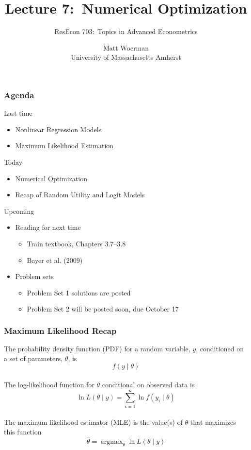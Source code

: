 \documentclass{beamer}
\title[Lecture 7:\ Numerical Optimization]{Lecture 7:\ Numerical Optimization}
\author[ResEcon 703:\ Advanced Econometrics]{ResEcon 703:\ Topics in Advanced Econometrics}
\date{Matt Woerman\\University of Massachusetts Amherst}
\DeclareMathOperator*{\argmax}{argmax}
\begin{document}
{ 
\begin{frame}[noframenumbering]
    \titlepage
\end{frame}
}

\begin{frame}\frametitle{Agenda}
    Last time
    \begin{itemize}
    	\item Nonlinear Regression Models
        \item Maximum Likelihood Estimation
    \end{itemize}
    \vspace{2ex}
    Today
    \begin{itemize}
    	\item Numerical Optimization
    	\item Recap of Random Utility and Logit Models
    \end{itemize}
    \vspace{2ex}
    Upcoming
    \begin{itemize}
        \item Reading for next time
        \begin{itemize}
            \item Train textbook, Chapters 3.7--3.8
            \item Bayer et al. (2009)
        \end{itemize}
        \item Problem sets
        \begin{itemize}
            \item Problem Set 1 solutions are posted
            \item Problem Set 2 will be posted soon, due October 17
        \end{itemize}
    \end{itemize}
\end{frame}

\begin{frame}\frametitle{Maximum Likelihood Recap}
    The probability density function (PDF) for a random variable, $y$, conditioned on a set of parameters, $\theta$, is
    $$f(y \mid \theta)$$ \\
    The log-likelihood function for $\theta$ conditional on observed data is
    $$\ln L(\theta \mid y) = \sum_{i = 1}^n \ln f(y_i \mid \theta)$$ \\
    The maximum likelihood estimator (MLE) is the value(s) of $\theta$ that maximizes this function
    $$\hat{\theta} = \argmax_\theta \ln L(\theta \mid y)$$
\end{frame}
\end{document}
